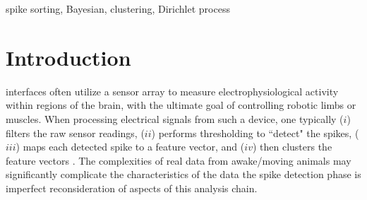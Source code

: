 \documentclass[journal]{IEEEtran}
\begin{document}
\begin{IEEEkeywords}
spike sorting, Bayesian, clustering, Dirichlet process
\end{IEEEkeywords}






%
\IEEEpeerreviewmaketitle



\section{Introduction\label{sec:intro}}
%
%
%
%
 interfaces often utilize a sensor array to measure electrophysiological activity within regions of the brain, with the ultimate goal of controlling robotic limbs \cite{Nature2012} or muscles. When processing electrical signals from such a device, one typically ($i$) filters the raw sensor readings, ($ii$) performs thresholding
to ``detect" the spikes, ($iii$) maps each detected spike to a
feature vector, and ($iv$) then clusters the feature vectors
\cite{Lewicki}. The complexities of real data\remove{,} from awake/moving animals\remove{,} may significantly complicate the characteristics of the data the spike detection phase is imperfect reconsideration of aspects of this analysis chain.
\end{document}
